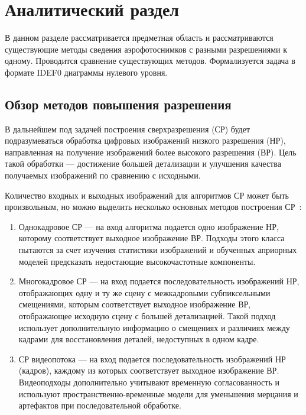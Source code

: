 \chapter{Аналитический раздел}

В данном разделе рассматривается предметная область и рассматриваются существующие методы сведения аэрофотоснимков с разными разрешениями к одному. Проводится сравнение существующих методов. Формализуется задача в формате IDEF0 диаграммы нулевого уровня. 

\section{Обзор методов повышения разрешения}

В дальнейшем под задачей построения сверхразрешения (СР) будет подразумеваться обработка цифровых изображений низкого разрешения (НР), направленная на получение изображений более высокого разрешения (ВР). Цель такой обработки --- достижение большей детализации и улучшения качества получаемых изображений по сравнению с исходными.

Количество входных и выходных изображений для алгоритмов СР может быть произвольным, но можно выделить несколько основных методов построения СР~\cite{сиротаалгоритмы}:

\begin{enumerate}[label=---]
    \item Однокадровое СР --- на вход алгоритма подается одно изображение НР, которому соответствует выходное изображение ВР. Подходы этого класса пытаются за счет изучения статистики изображений и обученных априорных моделей предсказать недостающие высокочастотные компоненты.
    \item Многокадровое СР --- на вход подается последовательность изображений НР, отображающих одну и ту же сцену с межкадровыми субпиксельными смещениями, которым соответствует выходное изображение ВР, отображающее исходную сцену с большей детализацией. Такой подход использует дополнительную информацию о смещениях и различиях между кадрами для восстановления деталей, недоступных в одном кадре.
    \item СР видеопотока --- на вход подается последовательность изображений НР (кадров), каждому из которых соответствует выходное изображение ВР. Видеоподходы дополнительно учитывают временную согласованность и используют пространственно-временные модели для уменьшения мерцания и артефактов при последовательной обработке.
\end{enumerate}

